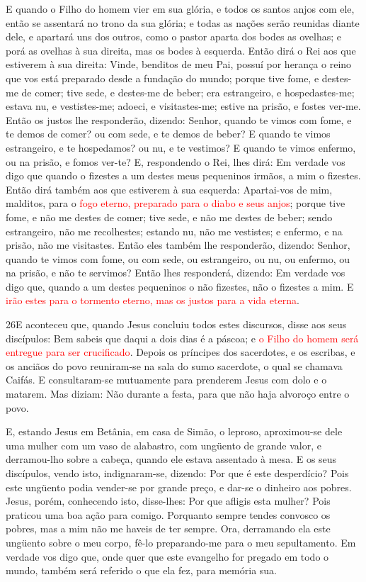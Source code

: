 E quando o Filho do homem vier em sua glória, e todos os santos
anjos com ele, então se assentará no trono da sua glória; e
todas as nações serão reunidas diante dele, e apartará uns dos
outros, como o pastor aparta dos bodes as ovelhas; e porá as
ovelhas à sua direita, mas os bodes à esquerda. Então dirá o
Rei aos que estiverem à sua direita: Vinde, benditos de meu Pai,
possuí por herança o reino que vos está preparado desde a fundação
do mundo; porque tive fome, e destes-me de comer; tive sede,
e destes-me de beber; era estrangeiro, e hospedastes-me;
estava nu, e vestistes-me; adoeci, e visitastes-me; estive na
prisão, e fostes ver-me. Então os justos lhe responderão,
dizendo: Senhor, quando te vimos com fome, e te demos de comer? ou
com sede, e te demos de beber? E quando te vimos estrangeiro,
e te hospedamos? ou nu, e te vestimos? E quando te vimos
enfermo, ou na prisão, e fomos ver-te? E, respondendo o Rei,
lhes dirá: Em verdade vos digo que quando o fizestes a um destes
meus pequeninos irmãos, a mim o fizestes. Então dirá também
aos que estiverem à sua esquerda: Apartai-vos de mim, malditos, para
o \textcolor{red}{fogo eterno, preparado para o diabo e seus anjos};
porque tive fome, e não me destes de comer; tive sede, e não
me destes de beber; sendo estrangeiro, não me recolhestes;
estando nu, não me vestistes; e enfermo, e na prisão, não me
visitastes. Então eles também lhe responderão, dizendo:
Senhor, quando te vimos com fome, ou com sede, ou estrangeiro, ou
nu, ou enfermo, ou na prisão, e não te servimos? Então lhes
responderá, dizendo: Em verdade vos digo que, quando a um destes
pequeninos o não fizestes, não o fizestes a mim. E
\textcolor{red}{irão estes para o tormento eterno, mas os justos para a vida
eterna}.

\medskip

\lettrine{26} E aconteceu que, quando Jesus concluiu todos
estes discursos, disse aos seus discípulos: Bem sabeis que daqui
a dois dias é a páscoa; e \textcolor{red}{o Filho do homem será entregue
para ser crucificado}. Depois os príncipes dos sacerdotes, e os
escribas, e os anciãos do povo reuniram-se na sala do sumo
sacerdote, o qual se chamava Caifás. E consultaram-se mutuamente
para prenderem Jesus com dolo e o matarem. Mas diziam: Não
durante a festa, para que não haja alvoroço entre o povo.

E, estando Jesus em Betânia, em casa de Simão, o leproso,
aproximou-se dele uma mulher com um vaso de alabastro, com
ungüento de grande valor, e derramou-lho sobre a cabeça, quando ele
estava assentado à mesa. E os seus discípulos, vendo isto,
indignaram-se, dizendo: Por que é este desperdício? Pois este
ungüento podia vender-se por grande preço, e dar-se o dinheiro aos
pobres. Jesus, porém, conhecendo isto, disse-lhes: Por que
afligis esta mulher? Pois praticou uma boa ação para comigo.
Porquanto sempre tendes convosco os pobres, mas a mim não me
haveis de ter sempre. Ora, derramando ela este ungüento sobre
o meu corpo, fê-lo preparando-me para o meu sepultamento. Em
verdade vos digo que, onde quer que este evangelho for pregado em
todo o mundo, também será referido o que ela fez, para memória sua.

